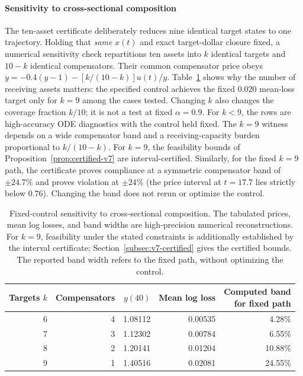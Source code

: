 \documentclass[review,hidelinks,onefignum,onetabnum]{siamonline250211}
\begin{document}
\paragraph{Sensitivity to cross-sectional composition}
The ten-asset certificate deliberately reduces nine identical target states to one trajectory. Holding that \emph{same} $x(t)$ and exact target-dollar closure fixed, a numerical sensitivity check repartitions ten assets into $k$ identical targets and $10-k$ identical compensators. Their common compensator price obeys $\dot y=-0.4(y-1)-[k/(10-k)]u(t)/y$. Table~\ref{tab:sensitivity} shows why the number of receiving assets matters: the specified control achieves the fixed $0.020$ mean-loss target only for $k=9$ among the cases tested. Changing $k$ also changes the coverage fraction $k/10$; it is not a test at fixed $\alpha=0.9$. For $k<9$, the rows are high-accuracy ODE diagnostics with the control held fixed. The $k=9$ witness depends on a wide compensator band and a receiving-capacity burden proportional to $k/(10-k)$. For $k=9$, the feasibility bounds of Proposition~\ref{prop:certified-v7} are interval-certified. Similarly, for the fixed $k=9$ path, the certificate proves compliance at a symmetric compensator band of $\pm24.7\%$ and proves violation at $\pm24\%$ (the price interval at $t=17.7$ lies strictly below $0.76$). Changing the band does not rerun or optimize the control.
\begin{table}[H]\centering\small
\caption{Fixed-control sensitivity to cross-sectional composition. The tabulated prices, mean log losses, and band widths are high-precision numerical reconstructions. For $k=9$, feasibility under the stated constraints is additionally established by the interval certificate; Section~\ref{subsec:v7-certified} gives the certified bounds. The reported band width refers to the fixed path, without optimizing the control.}\label{tab:sensitivity}
\begin{tabular}{@{}rrrrr@{}}\toprule
Targets $k$ & Compensators & $y(40)$ & Mean log loss & \shortstack{Computed band\\for fixed path} \\\midrule
6 & 4 & 1.08112 & 0.00535 & 4.28\%\\
7 & 3 & 1.12302 & 0.00784 & 6.55\%\\
8 & 2 & 1.20141 & 0.01204 & 10.88\%\\
9 & 1 & 1.40516 & 0.02081 & 24.55\%\\
\bottomrule\end{tabular}
\end{table}
\end{document}
